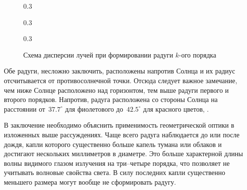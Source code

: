 \begin{figure}[h!]
    \begin{subcaptionblock}{0.3\tw}
        \centering
        \label{pic:rainbow-disp-1}
    \end{subcaptionblock}
    \hfill
    \begin{subcaptionblock}{0.3\tw}
        \centering
        \label{pic:rainbow-disp-2}
    \end{subcaptionblock}
    \hfill
    \begin{subcaptionblock}{0.3\tw}
        \centering
        \label{pic:rainbow-disp-3}
    \end{subcaptionblock}
    \caption{Схема дисперсии лучей при формировании радуги $k$-ого порядка}
\end{figure}

Обе радуги, несложно заключить, расположены напротив Солнца и их радиус отсчитывается от противосолнечной точки. Отсюда следует важное замечание, чем ниже Солнце расположено над горизонтом, тем выше радуги первого и второго порядков. Напротив,  радуга расположена со стороны Солнца на расстоянии от~$37.7^\circ$ для фиолетового до~$42.5^\circ$ для красного цветов, .

В заключение необходимо объяснить применимость геометрической оптики в изложенных выше рассуждениях. Чаще всего радуга наблюдается до или после дождя, капли которого существенно больше капель тумана или облаков и достигают нескольких миллиметров в диаметре. Это больше характерной длины волны видимого глазом излучения на три--четыре порядка, что позволяет не учитывать волновые свойства света. В силу последних капли существенно меньшего размера могут вообще не сформировать радугу. 